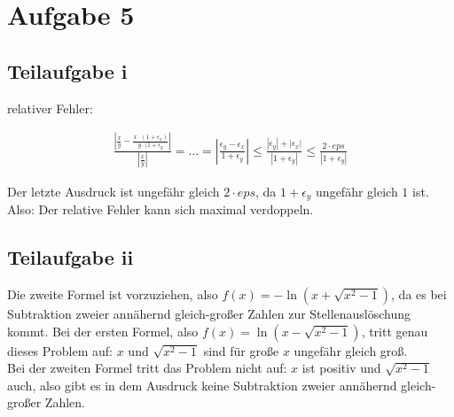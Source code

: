 \section*{Aufgabe 5}
\subsection*{Teilaufgabe i}
relativer Fehler:

\begin{align}
	\frac{ | \frac{x}{y} - \frac{x \cdot (1 + \epsilon_x)}{y \cdot (1 + \epsilon_y}|}{|\frac{x}{y}|}
	= \ldots = |\frac{\epsilon_y - \epsilon_x }{1 + \epsilon_y} |
	\le \frac{|\epsilon_y | + | \epsilon_x |}{|1 + \epsilon_y|} \le \frac{2 \cdot eps}{|1 + \epsilon_y|} 
\end{align}

Der letzte Ausdruck ist ungefähr gleich $2 \cdot eps$, da $1 + \epsilon_y$ ungefähr gleich $1$ ist.
Also: Der relative Fehler kann sich maximal verdoppeln.

\subsection*{Teilaufgabe ii}
Die zweite Formel ist vorzuziehen, also $f(x) = -\ln (x + \sqrt{x^2-1})$, da es bei Subtraktion zweier annähernd gleich-großer Zahlen zur Stellenauslöschung kommt. Bei der ersten Formel, also $f(x) = \ln (x - \sqrt{x^2-1})$, tritt genau dieses Problem auf: $x$ und $\sqrt{x^2-1}$ sind für große $x$ ungefähr gleich groß. \\
Bei der zweiten Formel tritt das Problem nicht auf: $x$ ist positiv und $\sqrt{x^2 - 1}$ auch, also gibt es in dem Ausdruck keine Subtraktion zweier annähernd gleich-großer Zahlen.

